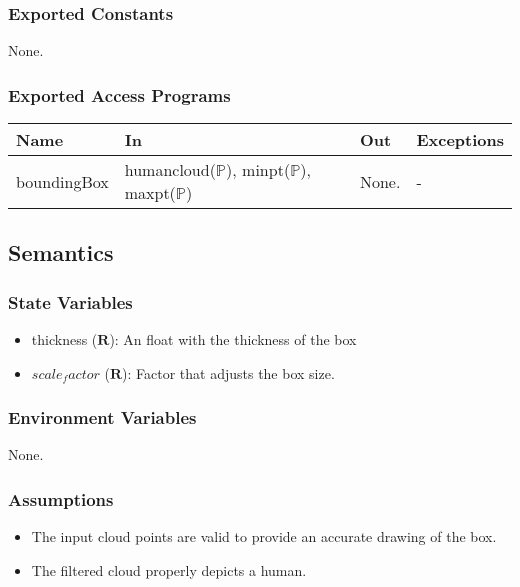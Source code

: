 \documentclass[12pt, titlepage]{article}
\begin{document}
\subsubsection{Exported Constants}

None.

\subsubsection{Exported Access Programs}

\begin{center}
\begin{tabular}{p{3cm} p{4cm} p{2cm} p{2cm}}
\hline
\textbf{Name} & \textbf{In} & \textbf{Out} & \textbf{Exceptions} \\
\hline
boundingBox & humancloud($\mathbb{P}$),
              minpt($\mathbb{P}$),
              maxpt($\mathbb{P}$) & None. & - \\
\hline
\end{tabular}
\end{center}

\subsection{Semantics}

\subsubsection{State Variables}

\begin{itemize}
  \item thickness ($\mathbf{R}$): An float with the thickness of the box
  \item $scale_factor$ ($\mathbf{R}$): Factor that adjusts the box size.
\end{itemize}

\subsubsection{Environment Variables}

None.

\subsubsection{Assumptions}

\begin{itemize}
  \item The input cloud points are valid to provide an accurate drawing of the box.
  \item The filtered cloud properly depicts a human.
\end{itemize}
\end{document}
